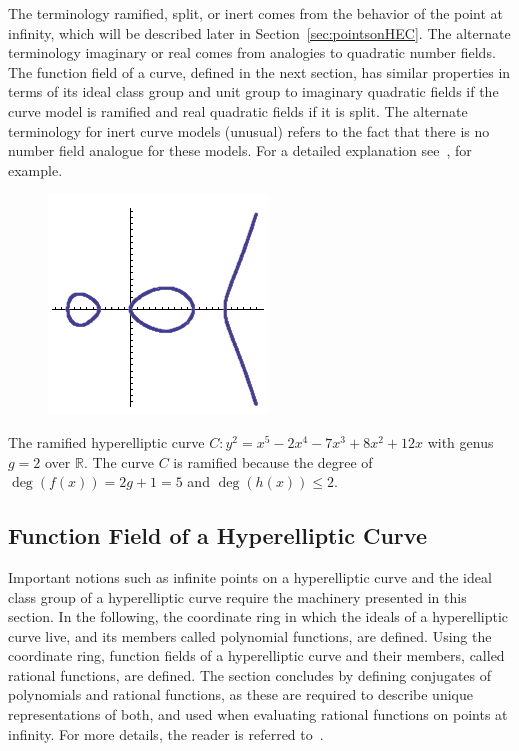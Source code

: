 The terminology ramified, split, or inert comes from the behavior of the point
at infinity, which will be described later in Section~\ref{sec:pointsonHEC}. The
alternate terminology imaginary or real comes from analogies to quadratic number
fields. The function field of a curve, defined in the next section, has similar
properties in terms of its ideal class group and unit group to imaginary
quadratic fields if the curve model is ramified and real quadratic fields if it
is split. The alternate terminology for inert curve models (unusual) refers to
the fact that there is no number field analogue for these models. For a detailed
explanation see~\cite{HandbookFF_2013}, for example.

\be
\begin{figure}[ht]
\label{fig:hec}\centering
\includegraphics[scale=.75]{hec2}
\end{figure}

The ramified hyperelliptic curve $C: y^2 = x^5 -2x^4 -7x^3 + 8x^2 + 12x$ with
genus $g=2$ over $\mathbb{R}$. The curve $C$ is ramified because the degree of
$\deg(f(x)) = 2g + 1 = 5$ and $\deg(h(x)) \leq 2$.
\ee 

\subsection{Function Field of a Hyperelliptic Curve}
Important notions such as infinite points on a hyperelliptic curve and the ideal
class group of a hyperelliptic curve require the machinery presented in this
section. In the following, the coordinate ring in which the ideals of a
hyperelliptic curve live, and its members called polynomial functions, are
defined. Using the coordinate ring, function fields of a hyperelliptic curve and
their members, called rational functions, are defined. The section concludes by
defining conjugates of polynomials and rational functions, as these are required
to describe unique representations of both, and used when evaluating rational
functions on points at infinity. For more details, the reader is referred
to~\cite{MenezesWuZuccherato_elementary_1996}.


